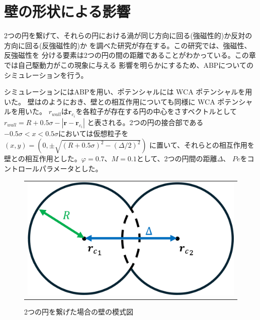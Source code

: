 \documentclass[/Users/ikedahajime/GitHub/reserch/master_report/thesis]{subfiles}
\begin{document}
\renewcommand{\prechaptername}{付録}
\renewcommand{\postchaptername}{}
\renewcommand{\thechapter}{\Alph{chapter}}
\setcounter{chapter}{0}

\chapter{壁の形状による影響}\label{subsec:result_abp_twowall}
2つの円を繋げて、それらの円における渦が同じ方向に回る(強磁性的)か反対の方向に回る(反強磁性的)か
を調べた研究が存在する\cite{beppuGeometrydrivenCollectiveOrdering2017}。この研究では、強磁性、反強磁性を
分ける要素は2つの円の間の距離であることがわかっている。この章では自己駆動力がこの現象に与える
影響を明らかにするため、ABPについてのシミュレーションを行う。%


シミュレーションにはABPを用い、ポテンシャルには WCA ポテンシャルを用いた。
壁はのようにおき、壁との相互作用についても同様に WCA ポテンシャルを用いた。
$r_{wall}$は$\bm{r}_{c_i}$を各粒子が存在する円の中心をさすベクトルとして$r_{wall}=R+0.5\sigma-\left|\bm{r}-\bm{r}_{c_i}\right|$
と表される。2つの円の接合部である$-0.5\sigma<x<0.5\sigma$においては仮想粒子を$(x,y)=(0,\pm\sqrt{(R+0.5\sigma)^2-(\Delta/2)^2})$
に置いて、それらとの相互作用を壁との相互作用とした。$\varphi=0.7、M=0.1$として、2つの円間の距離$\Delta$、
$Pe$をコントロールパラメータとした。
\begin{figure}
    \centering
    \begin{tabular}{c}
        \begin{minipage}{0.4\hsize}
            \includegraphics[width=\textwidth]{img/method/fig_twocer.png}
        \end{minipage}
    \end{tabular}
    \caption[Four sample images]
    {
        2つの円を繋げた場合の壁の模式図
    }
    \label{fig:wall_twowall}
\end{figure}
\end{document}
